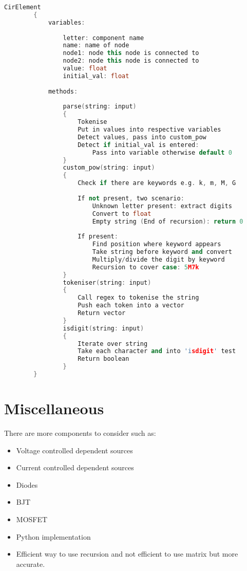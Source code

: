 \documentclass[a4paper, titlepage]{article}
\begin{document}
    \begin{lstlisting}[language=C++]
        CirElement 
        {
            variables:
    
                letter: component name
                name: name of node
                node1: node this node is connected to 
                node2: node this node is connected to
                value: float
                initial_val: float
    
            methods:
    
                parse(string: input)
                {
                    Tokenise
                    Put in values into respective variables
                    Detect values, pass into custom_pow
                    Detect if initial_val is entered:
                        Pass into variable otherwise default 0
                }
                custom_pow(string: input)
                {
                    Check if there are keywords e.g. k, m, M, G
    
                    If not present, two scenario:
                        Unknown letter present: extract digits 
                        Convert to float
                        Empty string (End of recursion): return 0
    
                    If present:
                        Find position where keyword appears
                        Take string before keyword and convert
                        Multiply/divide the digit by keyword
                        Recursion to cover case: 5M7k
                }
                tokeniser(string: input)
                {
                    Call regex to tokenise the string 
                    Push each token into a vector 
                    Return vector
                }
                isdigit(string: input)
                {
                    Iterate over string
                    Take each character and into 'isdigit' test
                    Return boolean
                }
        }
    \end{lstlisting}

    \pagebreak
    \section{Miscellaneous}
    There are more components to consider such as:
    \begin{itemize}
        \item Voltage controlled dependent sources
        \item Current controlled dependent sources
        \item Diodes
        \item BJT
        \item MOSFET
        \item Python implementation
        \item Efficient way to use recursion and not efficient to use matrix but more accurate.
    \end{itemize}


    \pagebreak
    \printbibliography[title={References}]
\end{document}
